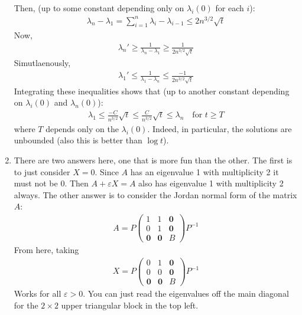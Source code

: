 \documentclass[12pt]{article}
\theoremstyle{definitionstyle}
\def\ve{\varepsilon}
\newcommand{\1}{\mathds 1}
\begin{document}
\begin{enumerate}
        Then, (up to some constant depending only on $\lambda_i(0)$ for each $i$):
        \begin{align*}
            \lambda_n - \lambda_1 = \sum_{i=1}^{n} \lambda_i - \lambda_{i-1} \leq 2n^{3/2} \sqrt{t}
        \end{align*}
        Now, 
        \begin{align*}
            \lambda_n' \geq \frac{1}{\lambda_n - \lambda_1} \geq \frac{1}{2n^{3/2} \sqrt{t}}
        \end{align*}
        Simutlaenously,
        \begin{align*}
            \lambda_1' \leq \frac{1}{\lambda_1 - \lambda_n} \leq \frac{-1}{2n^{3/2} \sqrt{t}}
        \end{align*}
        Integrating these inequalities shows that (up to another constant depending on $\lambda_i(0)$ and $\lambda_n(0)$):
        \begin{align*}
            \lambda_1 \leq \frac{-C}{n^{3/2}} \sqrt{t} \leq \frac{C}{n^{3/2}} \sqrt{t} \leq \lambda_n \quad \text{for $t \geq T$}
        \end{align*} where $T$ depends only on the $\lambda_i(0)$. Indeed, in particular, the solutions are unbounded (also this is better than $\log t$).

        \item There are two answers here, one that is more fun than the other. The first is to just consider $X = 0$. Since $A$ has an eigenvalue 1 with multiplicity 2 it must not be 0. Then $A+\ve X = A$ also has eigenvalue 1 with multiplicity 2 always. The other answer is to consider the Jordan normal form of the matrix $A$:
        \begin{align*}
            A = P\begin{pmatrix}
                1 & 1 & \mathbf{0} \\
                0 & 1 & \mathbf{0} \\
                \mathbf{0} & \mathbf{0} & B
            \end{pmatrix}P^{-1}
        \end{align*}
        From here, taking
        \begin{align*}
            X = P\begin{pmatrix}
                0 & 1 & \mathbf{0} \\
                0 & 0 & \mathbf{0} \\
                \mathbf{0} & \mathbf{0} & B
            \end{pmatrix}P^{-1}
        \end{align*}
        Works for all $\ve > 0$. You can just read the eigenvalues off the main diagonal for the $2 \times 2$ upper triangular block in the top left.
    \end{enumerate}
\end{document}
